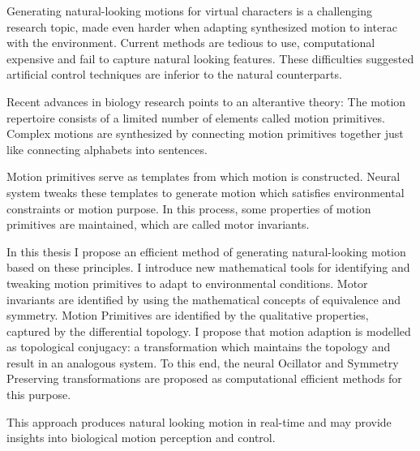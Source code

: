


\begin{abstracts}        %

Generating natural-looking motions for virtual characters is a challenging research topic, made even harder when adapting synthesized motion to interac with the environment. 
Current methods are tedious to use, computational expensive and fail to capture natural looking features.
These difficulties suggested artificial control techniques are inferior to the natural counterparts.

Recent advances in biology research points to an alterantive theory:
The motion repertoire consists of a limited number of elements called motion primitives. 
Complex motions are synthesized by connecting motion primitives together just like connecting alphabets into sentences.


Motion primitives serve as templates from which motion is constructed.
Neural system tweaks these templates to generate motion which satisfies  environmental constraints or motion purpose.
In this process, some properties of motion primitives are maintained, which are called motor invariants.


In this thesis I propose an efficient method of generating natural-looking motion based on these principles. 
I introduce new mathematical tools for identifying and tweaking motion primitives to adapt to environmental conditions.
Motor invariants are identified by using the mathematical concepts of equivalence and symmetry.
Motion Primitives are identified by the qualitative properties, captured by the differential topology.
I propose that motion adaption is modelled as topological conjugacy: a transformation which maintains the topology and result in an analogous system.
To this end, the neural Ocillator and Symmetry Preserving transformations are proposed as computational efficient methods for this purpose.

This approach produces natural looking motion in real-time and may provide insights into biological motion perception and control.

\end{abstracts}





